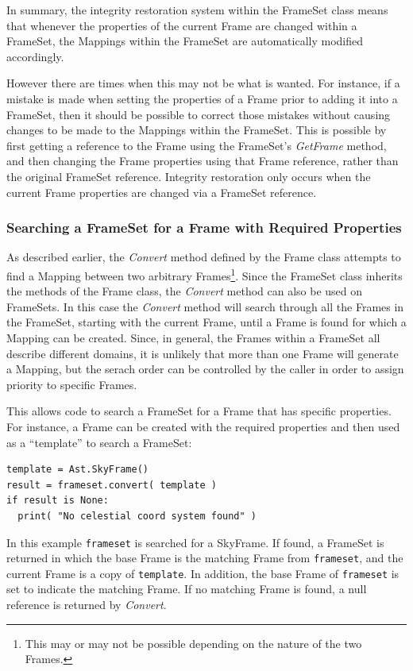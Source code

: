 \documentclass[final,authoryear,5p,times,twocolumn]{elsarticle}
\begin{document}
In summary, the integrity restoration system within the FrameSet class
means that whenever the properties of the current Frame are changed within a
FrameSet, the Mappings within the FrameSet are automatically modified
accordingly.

However there are times when this may not be what is wanted. For
instance, if a mistake is made when setting the properties of a Frame
prior to adding it into a FrameSet, then it should be possible to correct
those mistakes without causing changes to be made to the Mappings within
the FrameSet. This is possible by first getting a reference to the Frame
using the FrameSet's \emph{GetFrame} method, and then changing the Frame
properties using that Frame reference, rather than the original FrameSet
reference. Integrity restoration only occurs when the current Frame properties
are changed via a FrameSet reference.

\subsubsection{Searching a FrameSet for a Frame with Required Properties}
As described earlier, the \emph{Convert} method defined by the Frame
class attempts to find a Mapping between two arbitrary
Frames\footnote{This may or may not be possible depending on the nature
of the two Frames.}. Since the FrameSet class inherits the methods of the
Frame class, the \emph{Convert} method can also be used on FrameSets. In
this case the \emph{Convert} method will search through all the Frames
in the FrameSet, starting with the current Frame, until a Frame is found
for which a Mapping can be created. Since, in general, the Frames within a
FrameSet all describe different domains, it is unlikely that more than one
Frame will generate a Mapping, but the serach order can be controlled by
the caller in order to assign priority to specific Frames.

This allows code to search a FrameSet for a Frame that has specific
properties. For instance, a Frame can be created with the required
properties and then used as a ``template'' to search a FrameSet:

\begin{lstlisting}
template = Ast.SkyFrame()
result = frameset.convert( template )
if result is None:
  print( "No celestial coord system found" )
\end{lstlisting}

In this example \texttt{frameset} is searched for a SkyFrame. If found, a
FrameSet is returned in which the base Frame is the matching Frame from
\texttt{frameset}, and the current Frame is a copy of \texttt{template}.
In addition, the base Frame of \texttt{frameset} is set to indicate the
matching Frame. If no matching Frame is found, a null reference is
returned by \emph{Convert}.
\end{document}
